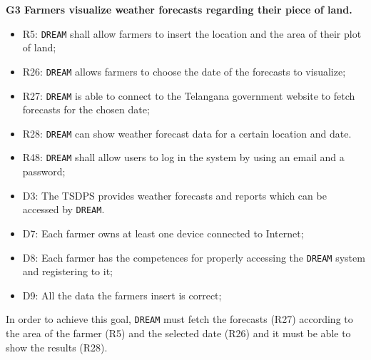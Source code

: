 \documentclass{article}
\begin{document}
\textbf{G3 Farmers visualize weather forecasts regarding their piece of land.}
\begin{itemize}
    \item R5: \verb|DREAM| shall allow farmers to insert the location and the area of their plot of land;

    \item R26: \verb|DREAM| allows farmers to choose the date of the forecasts to visualize;
  
    \item R27: \verb|DREAM| is able to connect to the Telangana government website to fetch forecasts for the chosen date;
  
    \item R28: \verb|DREAM| can show weather forecast data for a certain location and date.
    
    \item R48: \verb|DREAM| shall allow users to log in the system by using an email and a password;
    
    \item D3: The TSDPS provides weather forecasts and reports which can be accessed by \verb|DREAM|.
    
    \item D7: Each farmer owns at least one device connected to Internet;
    
    \item D8: Each farmer has the competences for properly accessing the \verb|DREAM| system and registering to it;
    
    \item D9: All the data the farmers insert is correct;
\end{itemize}
In order to achieve this goal, \verb|DREAM| must fetch the forecasts (R27) according to the area of the farmer (R5) and the selected date (R26) and it must be able to show the results (R28).
\end{document}
